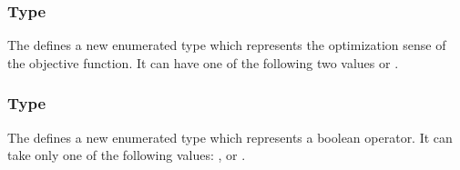 %

%

\subsubsection{Type }
\label{primtype-fbctype}

The \FBCPackage defines a new enumerated type  which
represents the optimization sense of the objective function. It can have one
of the following two values  or .

\subsubsection{Type }
\label{primtype-fbcoperation}

The \FBCPackage defines a new enumerated type  which
represents a boolean operator. It can take only one of the following values:
,  or .


